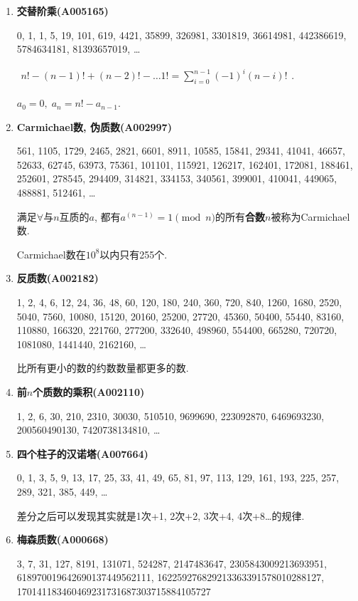 \begin{enumerate}
\item \textbf{交替阶乘(A005165)}

0, 1, 1, 5, 19, 101, 619, 4421, 35899, 326981, 3301819, 36614981, 442386619, 5784634181, 81393657019, \dots

$ \begin{aligned} n! - (n - 1)! + (n - 2)! - \dots 1! = \sum_{i = 0} ^ {n - 1} (-1)^i (n - i)! \end{aligned} $.

$ a_0 = 0,\; a_n = n! - a_{n - 1} $.

\item \textbf{Carmichael数, 伪质数(A002997)}

561, 1105, 1729, 2465, 2821, 6601, 8911, 10585, 15841, 29341, 41041, 46657, 52633, 62745, 63973, 75361, 101101, 115921, 126217, 162401, 172081, 188461, 252601, 278545, 294409, 314821, 334153, 340561, 399001, 410041, 449065, 488881, 512461, \dots

满足$\forall$与$n$互质的$a$, 都有$a ^ (n - 1) = 1 \pmod n$的所有\textbf{合数}$n$被称为Carmichael数.

Carmichael数在$10^8$以内只有255个.

\item \textbf{反质数(A002182)}

1, 2, 4, 6, 12, 24, 36, 48, 60, 120, 180, 240, 360, 720, 840, 1260, 1680, 2520, 5040, 7560, 10080, 15120, 20160, 25200, 27720, 45360, 50400, 55440, 83160, 110880, 166320, 221760, 277200, 332640, 498960, 554400, 665280, 720720, 1081080, 1441440, 2162160, \dots

比所有更小的数的约数数量都更多的数.

\item \textbf{前$n$个质数的乘积(A002110)}

1, 2, 6, 30, 210, 2310, 30030, 510510, 9699690, 223092870, 6469693230, 200560490130, 7420738134810, \dots

\item \textbf{四个柱子的汉诺塔(A007664)}

0, 1, 3, 5, 9, 13, 17, 25, 33, 41, 49, 65, 81, 97, 113, 129, 161, 193, 225, 257, 289, 321, 385, 449, \dots

差分之后可以发现其实就是1次+1, 2次+2, 3次+4, 4次+8\dots 的规律.

\item \textbf{梅森质数(A000668)}

3, 7, 31, 127, 8191, 131071, 524287, 2147483647, 2305843009213693951, 618970019642690137449562111, 162259276829213363391578010288127,\\170141183460469231731687303715884105727


\end{enumerate}
